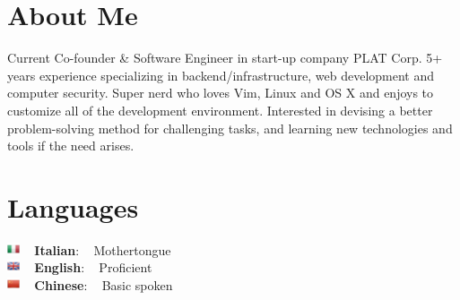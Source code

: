 \documentclass[letterpaper]{soragna-onepage-twocols} %
\begin{document}
\nocite{*}


\lastupdated %




\begin{minipage}[t]{0.3\textwidth} %


\section{About Me} 


Current Co-founder \& Software Engineer in start-up company PLAT Corp. 5+ years experience specializing in backend/infrastructure, web development and computer security. Super nerd who loves Vim, Linux and OS X and enjoys to customize all of the development environment. Interested in devising a better problem-solving method for challenging tasks, and learning new technologies and tools if the need arises.


\sectionspace %


\section{Languages} 


\includegraphics[width=1em]{images/flag/Italy.png} ~ {\bf Italian}: ~ Mothertongue\\
\includegraphics[width=1em]{images/flag/United-Kingdom.png} ~ {\bf English}: ~ Proficient\\
\includegraphics[width=1em]{images/flag/China.png} ~ {\bf Chinese}: ~ Basic spoken



\end{minipage}
\end{document}
